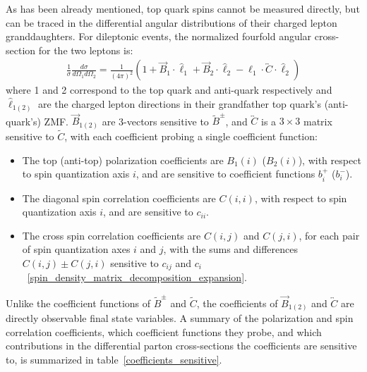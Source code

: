 As has been already mentioned, top quark spins cannot be measured directly, but can be traced in the differential angular distributions of their charged lepton granddaughters.
For \ttbar dileptonic events, the normalized fourfold angular cross-section for the two leptons is:
\begin{align}
\frac{1}{\sigma} \frac{d \sigma}{d \Omega_1 d \Omega_2}=\frac{1}{(4 \pi)^2}\left(1+\vec{B}_1 \cdot \hat{\ell}_1+\vec{B}_2 \cdot \hat{\ell}_2-\hat{\ell}_1 \cdot \overleftrightarrow{C} \cdot \hat{\ell}_2\right)
\label{fourfold_angular_distribution}
\end{align}
where 1 and 2 correspond to the top quark and anti-quark respectively and $\hat{\ell}_{1(2)}$ are the charged lepton directions in their grandfather top quark's (anti-quark's) ZMF.
$\vec{B}_{1(2)}$ are 3-vectors sensitive to $\tilde{B}^\pm$, and $\overleftrightarrow{C}$ is a $3\times3$ matrix sensitive to $\tilde{C}$, with each coefficient probing a single coefficient function:
\begin{itemize}
\item The top (anti-top) polarization coefficients are $B_{1}(i)$ ($B_{2}(i)$), with respect to spin quantization axis $i$, and are sensitive to coefficient functions $b^+_i$ ($b^-_i$).
\item The diagonal spin correlation coefficients are $C(i,i)$, with respect to spin quantization axis $i$, and are sensitive to $c_{ii}$.
\item The cross spin correlation coefficients are $C(i,j)$ and $C(j,i)$,  for each pair of spin quantization axes $i$ and $j$, with the sums and differences $C(i,j) \pm C(j,i)$ sensitive to $c_{ij}$ and $c_{i}$~\ref{spin_density_matrix_decomposition_expansion}.
\end{itemize}
Unlike the coefficient functions of $\tilde{B}^\pm$ and $\tilde{C}$, the coefficients of $\vec{B}_{1(2)}$ and $\overleftrightarrow{C}$ are directly observable final state variables.
A summary of the polarization and spin correlation coefficients, which coefficient functions they probe, and which contributions in the differential parton cross-sections the coefficients are sensitive to, is summarized in table~\ref{coefficients_sensitive}.
